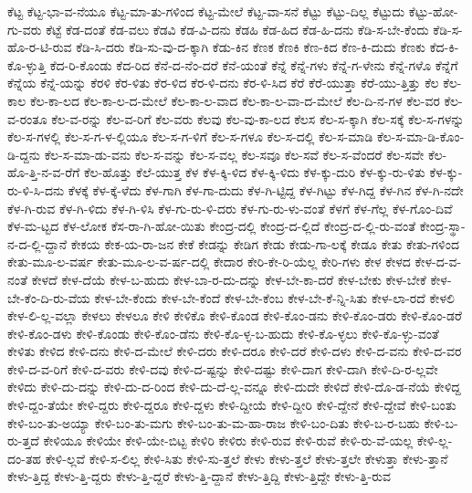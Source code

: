 {ಕೆಟ್ಟ
ಕೆಟ್ಟ-ಭಾ-ವ-ನೆಯೂ
ಕೆಟ್ಟ-ಮಾ-ತು-ಗಳಿಂದ
ಕೆಟ್ಟ-ಮೇಲೆ
ಕೆಟ್ಟ-ವಾ-ಸನೆ
ಕೆಟ್ಟು
ಕೆಟ್ಟು-ದಿಲ್ಲ
ಕೆಟ್ಟುದು
ಕೆಟ್ಟು-ಹೋ-ಗು-ವರು
ಕೆಟ್ಟೆ
ಕೆಡ-ದಂತೆ
ಕೆಡ-ವಲು
ಕೆಡವಿ
ಕೆಡ-ವಿ-ದನು
ಕೆಡಹಿ
ಕೆಡ-ಹಿದ
ಕೆಡ-ಹಿ-ದನು
ಕೆಡಿ-ಸ-ಬೇ-ಕೆಂದು
ಕೆಡಿ-ಸ-ಹೊ-ರ-ಟಿ-ರುವ
ಕೆಡಿ-ಸಿ-ದರು
ಕೆಡಿ-ಸು-ವು-ದ-ಕ್ಕಾಗಿ
ಕೆಡು-ಕಿನ
ಕೆಣಕ
ಕೆಣಕಿ
ಕೆಣ-ಕಿದ
ಕೆಣ-ಕಿ-ದುದು
ಕೆಣಕು
ಕೆದ-ಕಿ-ಕೊ-ಳ್ಳುತ್ತಿ
ಕೆದ-ರಿ-ಕೊಂಡು
ಕೆದ-ರಿದ
ಕೆನೆ-ದ-ನೆಂ-ದರೆ
ಕೆನೆ-ಯಂತೆ
ಕೆನ್ನೆ
ಕೆನ್ನೆ-ಗಳು
ಕೆನ್ನೆ-ಗ-ಳೇನು
ಕೆನ್ನೆ-ಗಳೊ
ಕೆನ್ನೆಗೆ
ಕೆನ್ನೆಯ
ಕೆನ್ನೆ-ಯನ್ನು
ಕೆರಳಿ
ಕೆರ-ಳಿತು
ಕೆರ-ಳಿದ
ಕೆರ-ಳಿ-ದನು
ಕೆರ-ಳಿ-ಸಿದ
ಕೆರೆ
ಕೆರೆ-ಯುತ್ತಾ
ಕೆರೆ-ಯು-ತ್ತಿತ್ತು
ಕೆಲ
ಕೆಲ-ಕಾಲ
ಕೆಲ-ಕಾ-ಲದ
ಕೆಲ-ಕಾ-ಲ-ದ-ಮೇಲೆ
ಕೆಲ-ಕಾ-ಲ-ವಾದ
ಕೆಲ-ಕಾ-ಲ-ವಾ-ದ-ಮೇಲೆ
ಕೆಲ-ದಿ-ನ-ಗಳ
ಕೆಲ-ವರ
ಕೆಲ-ವ-ರಂತೂ
ಕೆಲ-ವ-ರನ್ನು
ಕೆಲ-ವ-ರಿಗೆ
ಕೆಲ-ವರು
ಕೆಲವು
ಕೆಲ-ವು-ಕಾ-ಲದ
ಕೆಲಸ
ಕೆಲ-ಸ-ಕ್ಕಾಗಿ
ಕೆಲ-ಸಕ್ಕೆ
ಕೆಲ-ಸ-ಗಳನ್ನು
ಕೆಲ-ಸ-ಗಳಲ್ಲಿ
ಕೆಲ-ಸ-ಗ-ಳ-ಲ್ಲಿಯೂ
ಕೆಲ-ಸ-ಗ-ಳಿಗೆ
ಕೆಲ-ಸ-ಗಳೂ
ಕೆಲ-ಸ-ದಲ್ಲಿ
ಕೆಲ-ಸ-ಮಾಡಿ
ಕೆಲ-ಸ-ಮಾ-ಡಿ-ಕೊಂ-ಡಿ-ದ್ದನು
ಕೆಲ-ಸ-ಮಾ-ಡು-ವನು
ಕೆಲ-ಸ-ವನ್ನು
ಕೆಲ-ಸ-ವಲ್ಲ
ಕೆಲ-ಸವೂ
ಕೆಲ-ಸವೆ
ಕೆಲ-ಸ-ವೆಂದರೆ
ಕೆಲ-ಸವೇ
ಕೆಲ-ಹೊ-ತ್ತಿ-ನ-ವ-ರೆಗೆ
ಕೆಲ-ಹೊತ್ತು
ಕೆಲೆ-ಯುತ್ತ
ಕೆಳ
ಕೆಳ-ಕ್ಕಿ-ಳಿದ
ಕೆಳ-ಕ್ಕಿ-ಳಿದು
ಕೆಳ-ಕ್ಕು-ದುರಿ
ಕೆಳ-ಕ್ಕು-ರು-ಳಿತು
ಕೆಳ-ಕ್ಕು-ರು-ಳಿ-ಸಿ-ದನು
ಕೆಳಕ್ಕೆ
ಕೆಳ-ಕ್ಕೆ-ಳೆದು
ಕೆಳ-ಗಾಗಿ
ಕೆಳ-ಗಾ-ದುದು
ಕೆಳ-ಗಿ-ಟ್ಟಿದ್ದ
ಕೆಳ-ಗಿಟ್ಟು
ಕೆಳ-ಗಿದ್ದ
ಕೆಳ-ಗಿನ
ಕೆಳ-ಗಿ-ನದೇ
ಕೆಳ-ಗಿ-ರುವ
ಕೆಳ-ಗಿ-ಳಿದು
ಕೆಳ-ಗಿ-ಳಿಸಿ
ಕೆಳ-ಗು-ರು-ಳಿ-ದರು
ಕೆಳ-ಗು-ರು-ಳು-ವಂತೆ
ಕೆಳಗೆ
ಕೆಳ-ಗೆಲ್ಲ
ಕೆಳ-ಗೊಂ-ದಿವೆ
ಕೆಳ-ಮ-ಟ್ಟದ
ಕೆಳ-ಲೋಕ
ಕೆಸ-ರಾ-ಗಿ-ಹೋ-ಯಿತು
ಕೇಂದ್ರ-ದಲ್ಲಿ
ಕೇಂದ್ರ-ದ-ಲ್ಲಿದೆ
ಕೇಂದ್ರ-ದ-ಲ್ಲಿ-ರು-ವಂತೆ
ಕೇಂದ್ರ-ಸ್ಥಾ-ನ-ದ-ಲ್ಲಿ-ದ್ದಾನೆ
ಕೇಕಯ
ಕೇಕ-ಯ-ರಾ-ಜನ
ಕೇಕೆ
ಕೇಡನ್ನು
ಕೇಡಿಗ
ಕೇಡು
ಕೇಡು-ಗಾ-ಲಕ್ಕೆ
ಕೇಡೂ
ಕೇತು
ಕೇತು-ಗಳಿಂದ
ಕೇತು-ಮೂ-ಲ-ವರ್ಷ
ಕೇತು-ಮೂ-ಲ-ವ-ರ್ಷ-ದಲ್ಲಿ
ಕೇದಾರ
ಕೇರಿ-ಕೇ-ರಿ-ಯೆಲ್ಲ
ಕೇರಿ-ಗಳು
ಕೇಳ
ಕೇಳದ
ಕೇಳ-ದ-ವ-ನಂತೆ
ಕೇಳದೆ
ಕೇಳ-ದೆಯೆ
ಕೇಳ-ಬ-ಹುದು
ಕೇಳ-ಬಾ-ರ-ದು-ದನ್ನು
ಕೇಳ-ಬೇ-ಕಾ-ದರೆ
ಕೇಳ-ಬೇಕು
ಕೇಳ-ಬೇಕೆ
ಕೇಳ-ಬೇ-ಕೆಂ-ದಿ-ರು-ವೆಯ
ಕೇಳ-ಬೇ-ಕೆಂದು
ಕೇಳ-ಬೇ-ಕೆಂದೆ
ಕೇಳ-ಬೇ-ಕೆಂಬ
ಕೇಳ-ಬೇ-ಕೆ-ನ್ನಿ-ಸಿತು
ಕೇಳ-ಲಾ-ರದೆ
ಕೇಳಲಿ
ಕೇಳ-ಲಿ-ಲ್ಲ-ವಲ್ಲಾ
ಕೇಳಲು
ಕೇಳಲೂ
ಕೇಳಿ
ಕೇಳಿಕೊ
ಕೇಳಿ-ಕೊಂಡ
ಕೇಳಿ-ಕೊಂ-ಡನು
ಕೇಳಿ-ಕೊಂ-ಡರು
ಕೇಳಿ-ಕೊಂ-ಡರೆ
ಕೇಳಿ-ಕೊಂ-ಡಳು
ಕೇಳಿ-ಕೊಂಡು
ಕೇಳಿ-ಕೊಂ-ಡೆನು
ಕೇಳಿ-ಕೊ-ಳ್ಳ-ಬ-ಹುದು
ಕೇಳಿ-ಕೊ-ಳ್ಳಲು
ಕೇಳಿ-ಕೊ-ಳ್ಳು-ವಂತೆ
ಕೇಳಿತು
ಕೇಳಿದ
ಕೇಳಿ-ದನು
ಕೇಳಿ-ದ-ಮೇಲೆ
ಕೇಳಿ-ದರು
ಕೇಳಿ-ದರೂ
ಕೇಳಿ-ದರೆ
ಕೇಳಿ-ದಳು
ಕೇಳಿ-ದ-ವನು
ಕೇಳಿ-ದ-ವರ
ಕೇಳಿ-ದ-ವ-ರಿಗೆ
ಕೇಳಿ-ದ-ವರು
ಕೇಳಿ-ದವು
ಕೇಳಿ-ದ-ಷ್ಟನ್ನು
ಕೇಳಿ-ದಷ್ಟು
ಕೇಳಿ-ದಾಗ
ಕೇಳಿ-ದಾಗಿ
ಕೇಳಿ-ದಿ-ರ-ಲ್ಲವೇ
ಕೇಳಿದು
ಕೇಳಿ-ದು-ದನ್ನು
ಕೇಳಿ-ದು-ದ-ರಿಂದ
ಕೇಳಿ-ದು-ದೆ-ಲ್ಲ-ವನ್ನೂ
ಕೇಳಿ-ದುದೇ
ಕೇಳಿದೆ
ಕೇಳಿ-ದೊ-ಡ-ನೆಯೆ
ಕೇಳಿದ್ದ
ಕೇಳಿ-ದ್ದಂ-ತೆಯೇ
ಕೇಳಿ-ದ್ದರು
ಕೇಳಿ-ದ್ದರೂ
ಕೇಳಿ-ದ್ದಳು
ಕೇಳಿ-ದ್ದೀಯೆ
ಕೇಳಿ-ದ್ದೀರಿ
ಕೇಳಿ-ದ್ದೇನೆ
ಕೇಳಿ-ದ್ದೇವೆ
ಕೇಳಿ-ಬಂತು
ಕೇಳಿ-ಬಂ-ತು-ಅಯ್ಯಾ
ಕೇಳಿ-ಬಂ-ತು-ಮಗು
ಕೇಳಿ-ಬಂ-ತು-ಮ-ಹಾ-ರಾಜ
ಕೇಳಿ-ಬಂ-ದಿತು
ಕೇಳಿ-ಬ-ರ-ಬಹು
ಕೇಳಿ-ಬ-ರು-ತ್ತದೆ
ಕೇಳಿಯೂ
ಕೇಳಿಯೇ
ಕೇಳಿ-ಯೇ-ಬಿಟ್ಟ
ಕೇಳಿರಿ
ಕೇಳಿರು
ಕೇಳಿ-ರುವ
ಕೇಳಿ-ರುವೆ
ಕೇಳಿ-ರು-ವೆ-ಯಲ್ಲ
ಕೇಳಿ-ಲ್ಲ-ದಂ-ತಹ
ಕೇಳಿ-ಲ್ಲವೆ
ಕೇಳಿ-ಸ-ಲಿಲ್ಲ
ಕೇಳಿ-ಸಿತು
ಕೇಳಿ-ಸು-ತ್ತಲೆ
ಕೇಳು
ಕೇಳು-ತ್ತಲೆ
ಕೇಳು-ತ್ತಲೇ
ಕೇಳುತ್ತಾ
ಕೇಳು-ತ್ತಾನೆ
ಕೇಳು-ತ್ತಿದ್ದ
ಕೇಳು-ತ್ತಿ-ದ್ದರು
ಕೇಳು-ತ್ತಿ-ದ್ದರೆ
ಕೇಳು-ತ್ತಿ-ದ್ದಾನೆ
ಕೇಳು-ತ್ತಿದ್ದಿ
ಕೇಳು-ತ್ತಿದ್ದೇ
ಕೇಳು-ತ್ತಿ-ರುವ
}
